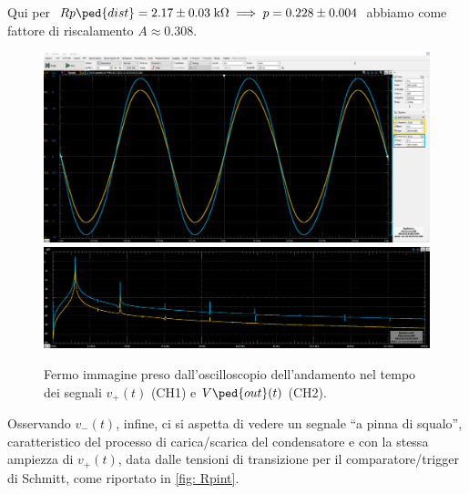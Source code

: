 \documentclass[10pt, a4paper, italian]{article}
\begin{document}
Qui per
$Rp\ped{dist} = 2.17 \pm 0.03 \; \si{k\ohm} \implies p = 0.228 \pm 0.004$ 
abbiamo come fattore di riscalamento $A \approx 0.308$. 
\begin{figure}[htbp]
	\centering
	\includegraphics[scale=0.335]{Rpdistosc800mV}
	\includegraphics[scale=0.37]{Rpdistosc800mVfft}
	\caption{Fermo immagine preso dall'oscilloscopio dell'andamento nel tempo dei
	segnali $v_+ (t)$ (CH1) e $V\ped{out} (t)$ (CH2). \label{fig: Rpdist}}
\end{figure}

Osservando $v_- (t)$, infine, ci si aspetta di vedere un segnale ``a pinna di
squalo'', caratteristico del processo di carica/scarica del condensatore e
con la stessa ampiezza di $v_+ (t)$, data dalle tensioni di transizione per
il comparatore/trigger di Schmitt, come riportato in \cref{fig: Rpint}.
\end{document}

